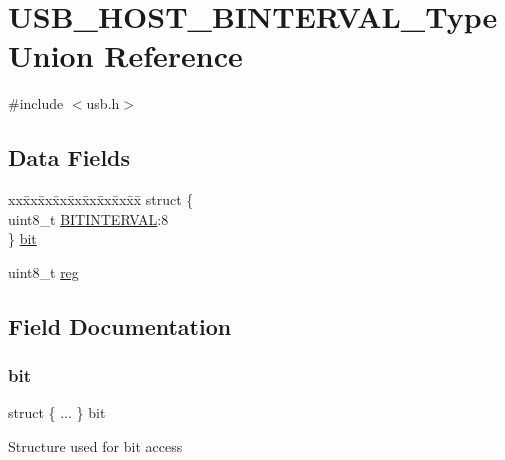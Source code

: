 \hypertarget{union_u_s_b___h_o_s_t___b_i_n_t_e_r_v_a_l___type}{}\section{U\+S\+B\+\_\+\+H\+O\+S\+T\+\_\+\+B\+I\+N\+T\+E\+R\+V\+A\+L\+\_\+\+Type Union Reference}
\label{union_u_s_b___h_o_s_t___b_i_n_t_e_r_v_a_l___type}


{\ttfamily \#include $<$usb.\+h$>$}

\subsection*{Data Fields}
\begin{DoxyCompactItemize}
\item 
\begin{tabbing}
xx\=xx\=xx\=xx\=xx\=xx\=xx\=xx\=xx\=\kill
struct \{\\
\>uint8\_t \mbox{\hyperlink{union_u_s_b___h_o_s_t___b_i_n_t_e_r_v_a_l___type_a278d2c2221226ce3c3f2d8cef518ec7c}{BITINTERVAL}}:8\\
\} \mbox{\hyperlink{union_u_s_b___h_o_s_t___b_i_n_t_e_r_v_a_l___type_a0cbd987a2606eaf8dfad2c7801f6980b}{bit}}\\

\end{tabbing}\item 
uint8\+\_\+t \mbox{\hyperlink{union_u_s_b___h_o_s_t___b_i_n_t_e_r_v_a_l___type_a9428adc9af4653a2050e2536b55dec8d}{reg}}
\end{DoxyCompactItemize}


\subsection{Field Documentation}
\mbox{\label{union_u_s_b___h_o_s_t___b_i_n_t_e_r_v_a_l___type_a0cbd987a2606eaf8dfad2c7801f6980b}} 
\subsubsection{\texorpdfstring{bit}{bit}}
{\footnotesize\ttfamily struct \{ ... \}   bit}

Structure used for bit access \mbox{\label{union_u_s_b___h_o_s_t___b_i_n_t_e_r_v_a_l___type_a278d2c2221226ce3c3f2d8cef518ec7c}} 
